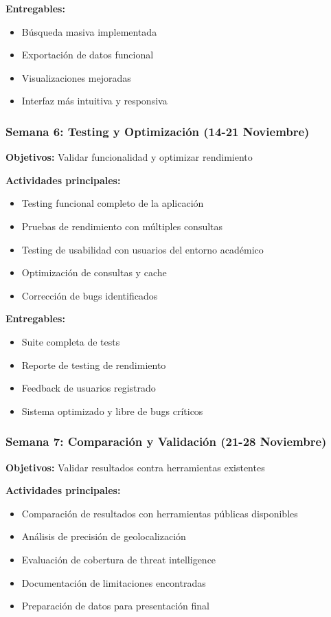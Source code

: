\textbf{Entregables:}
\begin{itemize}
    \item Búsqueda masiva implementada
    \item Exportación de datos funcional
    \item Visualizaciones mejoradas
    \item Interfaz más intuitiva y responsiva
\end{itemize}

\subsubsection{Semana 6: Testing y Optimización (14-21 Noviembre)}
\textbf{Objetivos:} Validar funcionalidad y optimizar rendimiento

\textbf{Actividades principales:}
\begin{itemize}
    \item Testing funcional completo de la aplicación
    \item Pruebas de rendimiento con múltiples consultas
    \item Testing de usabilidad con usuarios del entorno académico
    \item Optimización de consultas y cache
    \item Corrección de bugs identificados
\end{itemize}

\textbf{Entregables:}
\begin{itemize}
    \item Suite completa de tests
    \item Reporte de testing de rendimiento
    \item Feedback de usuarios registrado
    \item Sistema optimizado y libre de bugs críticos
\end{itemize}

\subsubsection{Semana 7: Comparación y Validación (21-28 Noviembre)}
\textbf{Objetivos:} Validar resultados contra herramientas existentes

\textbf{Actividades principales:}
\begin{itemize}
    \item Comparación de resultados con herramientas públicas disponibles
    \item Análisis de precisión de geolocalización
    \item Evaluación de cobertura de threat intelligence
    \item Documentación de limitaciones encontradas
    \item Preparación de datos para presentación final
\end{itemize}

